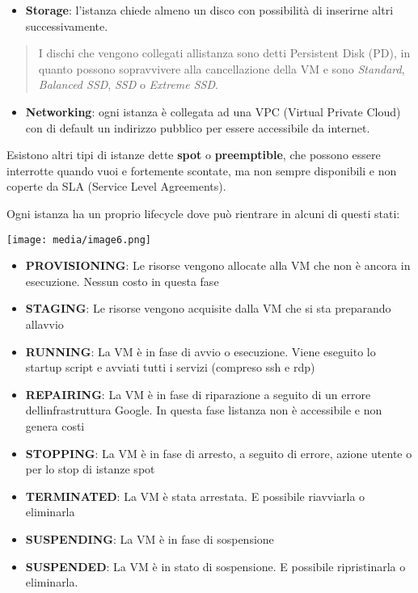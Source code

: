 \begin{itemize}
\item
  \textbf{Storage}: l'istanza chiede almeno un disco con possibilità di
  inserirne altri successivamente.
\end{itemize}

\begin{quote}
I dischi che vengono collegati all\textquotesingle istanza sono detti
Persistent Disk (PD), in quanto possono sopravvivere alla cancellazione
della VM e sono \emph{Standard}, \emph{Balanced SSD}, \emph{SSD} o
\emph{Extreme SSD}.
\end{quote}

\begin{itemize}
\item
  \textbf{Networking}: ogni istanza è collegata ad una VPC (Virtual
  Private Cloud) con di default un indirizzo pubblico per essere
  accessibile da internet.
\end{itemize}

Esistono altri tipi di istanze dette \textbf{spot} o
\textbf{preemptible}, che possono essere interrotte quando vuoi e
fortemente scontate, ma non sempre disponibili e non coperte da SLA
(Service Level Agreements).

Ogni istanza ha un proprio lifecycle dove può rientrare in alcuni di
questi stati:

\texttt{[image: media/image6.png]}

\begin{itemize}
\item
  \textbf{PROVISIONING}: Le risorse vengono allocate alla VM che non è
  ancora in esecuzione. Nessun costo in questa fase
\item
  \textbf{STAGING}: Le risorse vengono acquisite dalla VM che si sta
  preparando all\textquotesingle avvio
\item
  \textbf{RUNNING}: La VM è in fase di avvio o esecuzione. Viene
  eseguito lo startup script e avviati tutti i servizi (compreso ssh e
  rdp)
\item
  \textbf{REPAIRING}: La VM è in fase di riparazione a seguito di un
  errore dell\textquotesingle infrastruttura Google. In questa fase
  l\textquotesingle istanza non è accessibile e non genera costi
\item
  \textbf{STOPPING}: La VM è in fase di arresto, a seguito di errore,
  azione utente o per lo stop di istanze spot
\item
  \textbf{TERMINATED}: La VM è stata arrestata. E\textquotesingle{}
  possibile riavviarla o eliminarla
\item
  \textbf{SUSPENDING}: La VM è in fase di sospensione
\item
  \textbf{SUSPENDED}: La VM è in stato di sospensione.
  E\textquotesingle{} possibile ripristinarla o eliminarla.
\end{itemize}

